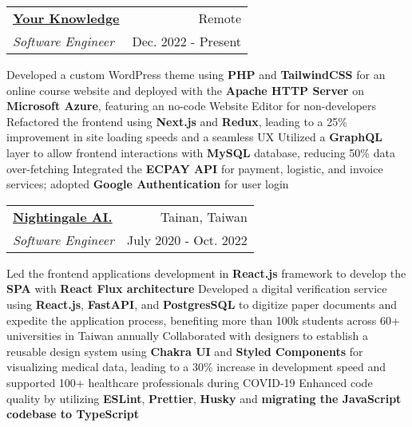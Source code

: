 \newcommand{\resumeExpEntry}[4]{
  \vspace{5pt}\item
    \begin{tabular*}{0.97\textwidth}{l@{\extracolsep{\fill}}r}
      \textbf{#1} & \small #2 \\
      \textit{#3} & \small #4 \\
    \end{tabular*}\vspace{-5pt}
}

\resumeExpEntry
{\href{https://yourknowledge.online}{Your Knowledge}}
{Remote}
{Software Engineer}
{Dec. 2022 - Present}
{
  \resumeItemListStart
    \resumeItem
    {Developed a custom WordPress theme using \textbf{PHP} and \textbf{TailwindCSS} for an online course website and deployed with the \textbf{Apache HTTP Server} on \textbf{Microsoft Azure}, featuring an no-code Website Editor for non-developers}
    \resumeItem
    {Refactored the frontend using \textbf{Next.js} and \textbf{Redux}, leading to a 25\% improvement in site loading speeds and a seamless UX}
    \resumeItem
    {Utilized a \textbf{GraphQL} layer to allow frontend interactions with \textbf{MySQL} database, reducing 50\% data over-fetching}
    \resumeItem
    {Integrated the \textbf{ECPAY API} for payment, logistic, and invoice services; adopted \textbf{Google Authentication} for user login}
  \resumeItemListEnd
}

\resumeExpEntry
{\href{https://19gale.ai}{Nightingale AI.}}
{Tainan, Taiwan}
{Software Engineer}
{July 2020 - Oct. 2022}
{
  \resumeItemListStart
    \resumeItem
    {Led the frontend applications development in \textbf{React.js} framework to develop the \textbf{SPA} with \textbf{React Flux architecture}}
    \resumeItem
    {Developed a digital verification service using \textbf{React.js}, \textbf{FastAPI}, and \textbf{PostgresSQL} to digitize paper documents and expedite the application process, benefiting more than 100k students across 60+ universities in Taiwan annually}
    \resumeItem
    {Collaborated with designers to establish a reusable design system using \textbf{Chakra UI} and \textbf{Styled Components} for visualizing medical data, leading to a 30\% increase in development speed and supported 100+ healthcare professionals during COVID-19}
    \resumeItem
    {Enhanced code quality by utilizing \textbf{ESLint}, \textbf{Prettier}, \textbf{Husky} and \textbf{migrating the JavaScript codebase to TypeScript}}
  \resumeItemListEnd
}

